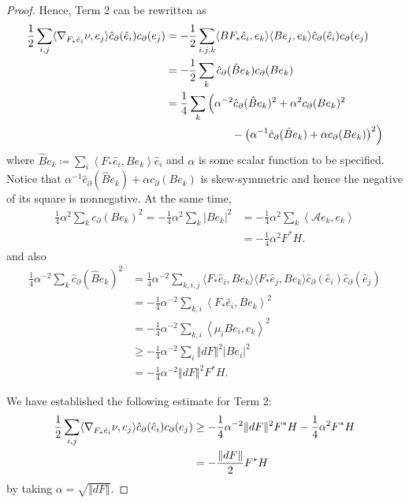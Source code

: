\documentclass[10pt,a4paper]{amsart}
\newcommand{\dom}[1]{\hat{#1}}
\newcommand{\inner}[1]{\langle #1 \rangle}
\newcommand{\onorm}[1]{\Vert #1 \Vert}
\newcommand{\pnorm}[1]{| #1 |}
\begin{document}
\begin{proof}
    Hence, Term 2 can be rewritten as
    \begin{align*}
        \frac{1}{2} \sum_{i, j} \inner{\conn[]_{F_*\dom{e}_i} \nu, e_j} \dom{c}_\partial(\dom{e}_i) c_\partial(e_j) &= -\frac{1}{2}\sum_{i,j,k} \inner{BF_*\dom{e}_i, e_k} \inner{Be_j,e_k} \dom{c}_\partial(\dom{e}_i) c_\partial(e_j) \\
        &= -\frac{1}{2} \sum_k \dom{c}_\partial(\dom{B} e_k) c_\partial(B e_k) \\
        &= \frac{1}{4} \sum_k \Big(\alpha^{-2} \dom{c}_\partial(\dom{B}e_k)^2 + \alpha^2 c_\partial(Be_k)^2 \\
        &\qquad\qquad\qquad -\big(\alpha^{-1} \dom{c}_\partial(\dom{B}e_k) + \alpha c_\partial(Be_k)\big)^2\Big)
    \end{align*}
    where \(\dom{B}e_k \coloneqq \sum_i \left< F_*\dom{e}_i, Be_k \right> \dom{e}_i\) and \(\alpha\) is some scalar function to be specified.
    Notice that \(\alpha^{-1} \dom{c}_\partial(\dom{B} e_k) + \alpha c_\partial(B e_k)\) is skew-symmetric and hence the negative of its square is nonnegative.
    At the same time,
    \begin{align*}
        \frac{1}{4} \alpha^2 \sum_k c_\partial(Be_k)^2 = -\frac{1}{4} \alpha^2 \sum_k \pnorm{B e_k}^2 &= -\frac{1}{4} \alpha^2 \sum_k \left<\mathcal{A}e_k, e_k\right> \\
        &= -\frac{1}{4} \alpha^2 F^*H.
    \end{align*}
    and also
    \begin{align*}
        \frac{1}{4} \alpha^{-2} \sum_k \dom{c}_\partial(\dom{B} e_k)^2 &=  \frac{1}{4} \alpha^{-2} \sum_{k,i,j} \inner{F_*\dom{e}_i, Be_k} \inner{F_*\dom{e}_j, Be_k} \dom{c}_\partial(\dom{e}_i) \dom{c}_\partial(\dom{e}_j)\\
        &= -\frac{1}{4} \alpha^{-2} \sum_{k,i} \left<F_*\dom{e}_i, Be_k\right>^2 \\
        &= -\frac{1}{4} \alpha^{-2} \sum_{k,i} \left<\mu_i Be_i, e_k\right>^2 \\
        &\geq -\frac{1}{4} \alpha^{-2} \sum_i \onorm{dF}^2 \pnorm{B e_i}^2 \\
        &= -\frac{1}{4} \alpha^{-2} \onorm{dF}^2 F^*H.
    \end{align*}

    We have established the following estimate for Term 2:
    \begin{align*}
        \frac{1}{2} \sum_{i, j} \inner{\conn[]_{F_*\dom{e}_i} \nu, e_j} \dom{c}_\partial(\dom{e}_i) c_\partial(e_j) &\geq -\frac{1}{4} \alpha^{-2} \onorm{dF}^2 F^*H - \frac{1}{4} \alpha^2 F^*H \\
        &= -\frac{\onorm{dF}}{2} F^*H
    \end{align*}
    by taking \(\alpha = \sqrt{\onorm{dF}}\).


\end{proof}
\end{document}
